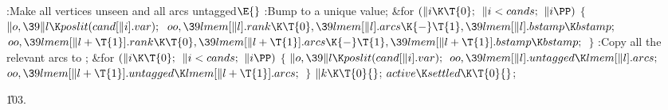 \Y\B\4:Make all vertices unseen and all arcs untagged\X${}\E{}$\6
:Bump  to a unique value\X;\6
\&{for} ${}(\|i\K\T{0};{}$ ${}\|i<\\{cands};{}$ ${}\|i\PP){}$\5
${}\{{}$\1\6
${}\|o,\39\|l\K\\{poslit}(\\{cand}[\|i].\\{var});{}$\6
${}\\{oo},\39\\{lmem}[\|l].\\{rank}\K\T{0},\39\\{lmem}[\|l].\\{arcs}\K{-}\T{1},%
\39\\{lmem}[\|l].\\{bstamp}\K\\{bstamp};{}$\6
${}\\{oo},\39\\{lmem}[\|l+\T{1}].\\{rank}\K\T{0},\39\\{lmem}[\|l+\T{1}].%
\\{arcs}\K{-}\T{1},\39\\{lmem}[\|l+\T{1}].\\{bstamp}\K\\{bstamp};{}$\6
\4${}\}{}$\2\6
:Copy all the relevant arcs to \X;\6
\&{for} ${}(\|i\K\T{0};{}$ ${}\|i<\\{cands};{}$ ${}\|i\PP){}$\5
${}\{{}$\1\6
${}\|o,\39\|l\K\\{poslit}(\\{cand}[\|i].\\{var});{}$\6
${}\\{oo},\39\\{lmem}[\|l].\\{untagged}\K\\{lmem}[\|l].\\{arcs};{}$\6
${}\\{oo},\39\\{lmem}[\|l+\T{1}].\\{untagged}\K\\{lmem}[\|l+\T{1}].\\{arcs};{}$%
\6
\4${}\}{}$\2\6
${}\|k\K\T{0}{}$;\6
${}\\{active}\K\\{settled}\K\T{0}{}$;\par
\U103.\fi

